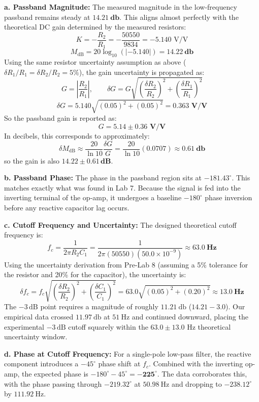 \documentclass[11pt]{article}
\begin{document}
\textbf{a. Passband Magnitude:} 
The measured magnitude in the low-frequency passband remains steady at $\mathbf{\SI{14.21}{\decibel}}$. This aligns almost perfectly with the theoretical DC gain determined by the measured resistors:
\[ K = -\frac{R_2}{R_1} = -\frac{50550}{9834} = -5.140 \text{ V/V} \]
\[ M_{\text{dB}} = 20 \log_{10}(|{-5.140}|) = \mathbf{\SI{14.22}{\decibel}} \]
Using the same resistor uncertainty assumption as above ($\delta R_1/R_1 = \delta R_2/R_2 = 5\%$), the gain uncertainty is propagated as:
\[ G = \left|\frac{R_2}{R_1}\right|, \qquad \delta G = G\sqrt{\left(\frac{\delta R_2}{R_2}\right)^2 + \left(\frac{\delta R_1}{R_1}\right)^2} \]
\[ \delta G = 5.140\sqrt{(0.05)^2 + (0.05)^2} = \mathbf{0.363 \text{ V/V}} \]
So the passband gain is reported as:
\[ G = \mathbf{5.14 \pm 0.36 \text{ V/V}} \]
In decibels, this corresponds to approximately:
\[ \delta M_{\text{dB}} \approx \frac{20}{\ln 10}\frac{\delta G}{G} = \frac{20}{\ln 10}(0.0707) \approx \mathbf{\SI{0.61}{\decibel}} \]
so the gain is also $\mathbf{14.22 \pm 0.61\,\text{dB}}$.

\textbf{b. Passband Phase:} 
The phase in the passband region sits at $\mathbf{-181.43^\circ}$. This matches exactly what was found in Lab 7. Because the signal is fed into the inverting terminal of the op-amp, it undergoes a baseline $-180^\circ$ phase inversion before any reactive capacitor lag occurs.

\textbf{c. Cutoff Frequency and Uncertainty:} 
The designed theoretical cutoff frequency is:
\[ f_c = \frac{1}{2\pi R_2 C_1} = \frac{1}{2\pi (50550)(50.0 \times 10^{-9})} \approx \mathbf{\SI{63.0}{\hertz}} \]
Using the uncertainty derivation from Pre-Lab 8 (assuming a 5\% tolerance for the resistor and 20\% for the capacitor), the uncertainty is:
\[ \delta f_c = f_c \sqrt{\left( \frac{\delta R_2}{R_2} \right)^2 + \left( \frac{\delta C_1}{C_1} \right)^2} = 63.0 \sqrt{(0.05)^2 + (0.20)^2} \approx \mathbf{\SI{13.0}{\hertz}} \]
The $-3\,\text{dB}$ point requires a magnitude of roughly $\SI{11.21}{\decibel}$ ($14.21 - 3.0$). Our empirical data crossed $\SI{11.97}{\decibel}$ at $\SI{51}{\hertz}$ and continued downward, placing the experimental $-3\,\text{dB}$ cutoff squarely within the $63.0 \pm 13.0 \text{ Hz}$ theoretical uncertainty window. 

\textbf{d. Phase at Cutoff Frequency:} 
For a single-pole low-pass filter, the reactive component introduces a $-45^\circ$ phase shift at $f_c$. Combined with the inverting op-amp, the expected phase is $-180^\circ - 45^\circ = \mathbf{-225^\circ}$. The data corroborates this, with the phase passing through $-219.32^\circ$ at $\SI{50.98}{\hertz}$ and dropping to $-238.12^\circ$ by $\SI{111.92}{\hertz}$.
\end{document}
